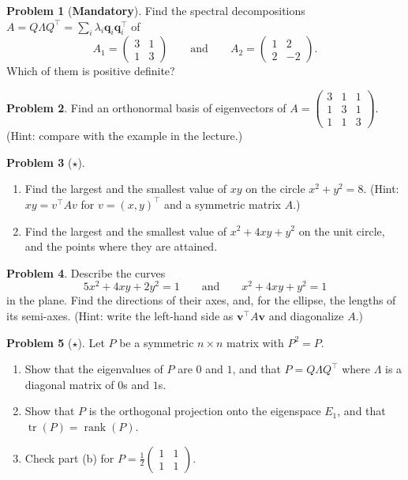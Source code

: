 \documentclass[11pt]{article}
\theoremstyle{definition}
\newtheorem{problem}{Problem}[section]
\newcommand{\mandatory}{\textcolor{red!70!black}{\textbf{Mandatory}}}
\DeclareMathOperator{\rank}{rank}
\DeclareMathOperator{\tr}{tr}
\begin{document}
\begin{problem}[\mandatory]\label{pr:spectral-2}
    Find the spectral decompositions $A = Q\Lambda Q^\top = \sum_i \lambda_i \mathbf{q}_i \mathbf{q}_i^\top$ of
    \[A_1 = \begin{pmatrix} 3 & 1 \\ 1 & 3 \end{pmatrix} \qquad \text{and} \qquad A_2 = \begin{pmatrix} 1 & 2 \\ 2 & -2 \end{pmatrix}.\]
    Which of them is positive definite?
\end{problem}

\begin{problem}\label{pr:spectral-3}
    Find an orthonormal basis of eigenvectors of $A = \begin{pmatrix} 3 & 1 & 1 \\ 1 & 3 & 1 \\ 1 & 1 & 3 \end{pmatrix}$. (Hint: compare with the example in the lecture.)
\end{problem}

\begin{problem}[$\star$]\label{pr:rayleigh}
    \begin{enumerate}[label=(\alph*)]
        \item Find the largest and the smallest value of $xy$ on the circle $x^2 + y^2 = 8$. (Hint: $xy = v^\top A v$ for $v = (x, y)^\top$ and a symmetric matrix $A$.)
        \item Find the largest and the smallest value of $x^2 + 4xy + y^2$ on the unit circle, and the points where they are attained.
    \end{enumerate}
\end{problem}

\begin{problem}\label{pr:quadric}
    Describe the curves
    \[5x^2 + 4xy + 2y^2 = 1 \qquad \text{and} \qquad x^2 + 4xy + y^2 = 1\]
    in the plane. Find the directions of their axes, and, for the ellipse, the lengths of its semi-axes. (Hint: write the left-hand side as $\mathbf{v}^\top A \mathbf{v}$ and diagonalize $A$.)
\end{problem}

\begin{problem}[$\star$]\label{pr:sym-idempotent}
    Let $P$ be a symmetric $n \times n$ matrix with $P^2 = P$.
    \begin{enumerate}[label=(\alph*)]
        \item Show that the eigenvalues of $P$ are $0$ and $1$, and that $P = Q \Lambda Q^\top$ where $\Lambda$ is a diagonal matrix of $0$s and $1$s.
        \item Show that $P$ is the orthogonal projection onto the eigenspace $E_1$, and that $\tr(P) = \rank(P)$.
        \item Check part (b) for $P = \frac{1}{2}\begin{pmatrix} 1 & 1 \\ 1 & 1 \end{pmatrix}$.
    \end{enumerate}
\end{problem}
\end{document}

